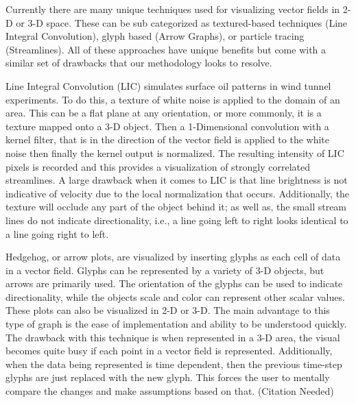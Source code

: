 Currently there are many unique techniques used for visualizing vector fields in 2-D or 3-D space. These can be sub categorized as textured-based techniques (Line Integral Convolution), glyph based (Arrow Graphs), or particle tracing (Streamlines). All of these approaches have unique benefits but come with a similar set of drawbacks that our methodology looks to resolve. \par

Line Integral Convolution (LIC) simulates surface oil patterns in wind tunnel experiments. To do this, a texture of white noise is applied to the domain of an area. This can be a flat plane at any orientation, or more commonly, it is a texture mapped onto a 3-D object. Then a 1-Dimensional convolution with a kernel filter, that is in the direction of the vector field is applied to the white noise then finally the kernel output is normalized\cite{Cabral1993}. The resulting intensity of LIC pixels is recorded and this provides a visualization of strongly correlated streamlines. A large drawback when it comes to LIC is that line brightness is not indicative of velocity due to the local normalization that occurs.  Additionally, the texture will occlude any part of the object behind it; as well as, the small stream lines do not indicate directionality, i.e., a line going left to right looks identical to a line going right to left. \cite{LIC}\par

Hedgehog, or arrow plots, are visualized by inserting glyphs as each cell of data in a vector field. Glyphs can be represented by a variety of 3-D objects, but arrows are primarily used. The orientation of the glyphs can be used to indicate directionality, while the objects scale and color can represent other scalar values. These plots can also be visualized in 2-D or 3-D. The main advantage to this type of graph is the ease of implementation and  ability to be understood quickly. The drawback with this technique is when represented in a 3-D area, the visual becomes quite busy if each point in a vector field is represented. Additionally, when the data being represented is time dependent, then the previous time-step glyphs are just replaced with the new glyph. This forces the user to mentally compare the changes and make assumptions based on that. (Citation Needed) 
\par

